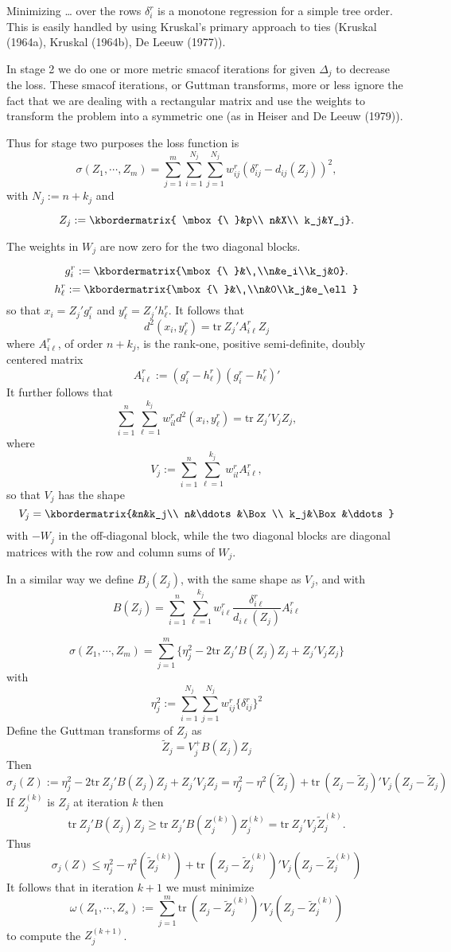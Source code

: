 \documentclass[
  12pt,
]{article}
\begin{document}
Minimizing \ldots{} over the rows \(\delta_i^r\) is a monotone regression for a simple tree order. This is easily handled by using Kruskal's primary approach
to ties (Kruskal (1964a), Kruskal (1964b), De Leeuw (1977)).

In stage 2 we do one or more metric smacof iterations for given \(\Delta_j\)
to decrease the loss. These smacof iterations, or Guttman transforms, more or less ignore the fact that we are dealing with a rectangular matrix and use the weights to transform the problem into a symmetric one (as in Heiser and De Leeuw (1979)).

Thus for stage two purposes the loss function is
\[
\sigma(Z_1,\cdots,Z_m)=\sum_{j=1}^m\sum_{i=1}^{N_j}\sum_{j=1}^{N_j}w_{ij}^r(\delta_{ij}^r-d_{ij}(Z_j))^2,
\]
with \(N_j:=n+k_j\) and

\[
Z_j:=\kbordermatrix{
\mbox{\ }&p\\
n&X\\
k_j&Y_j}.
\]

The weights in \(W_j\) are now zero for the two diagonal blocks.

\[
g_i^r:=\kbordermatrix{\mbox{\ }&\ \\n&e_i\\k_j&0}.
\]
\[
h_\ell^r:=\kbordermatrix{\mbox{\ }&\ \\n&0\\k_j&e_\ell}
\]
so that \(x_i=Z_j'g_i^r\) and \(y_\ell^r=Z_j'h_\ell^r\). It follows that
\[
d^2(x_i,y_\ell^r)=\text{tr}\ Z_j'A^r_{i\ell}Z_j^{\ }
\]
where \(A_{i\ell}^r\), of order \(n+k_j\), is the rank-one, positive semi-definite, doubly centered matrix
\[
A_{i\ell}^r:=(g_i^r-h_\ell^r)(g_i^r-h_\ell^r)'
\]
It further follows that
\[
\sum_{i=1}^n\sum_{\ell=1}^{k_j}w_{il}^rd^2(x_i,y_\ell^r)=\text{tr}\ Z_j'V_jZ_j,
\]
where
\[
V_j:=\sum_{i=1}^n\sum_{\ell=1}^{k_j}w_{il}^rA^r_{i\ell},
\]
so that \(V_j\) has the shape
\[
V_j=\kbordermatrix{&n&k_j\\
n&\ddots&\Box\\
k_j&\Box&\ddots}
\]
with \(-W_j\) in the off-diagonal block, while the two diagonal
blocks are diagonal matrices with the row and column sums of \(W_j\).

In a similar way we define \(B_j(Z_j)\), with the same shape as \(V_j\), and with
\[
B(Z_j)=\sum_{i=1}^n\sum_{\ell=1}^{k_j}w_{i\ell}^r\frac{\delta_{i\ell}^r }{d_{i\ell}(Z_j)}A^r_{i\ell}
\]

\[
\sigma(Z_1,\cdots,Z_m)=\sum_{j=1}^m\{\eta_j^2-2\text{tr}\ Z_j'B(Z_j)Z_j+Z_j'V_jZ_j\}
\]
with
\[
\eta_j^2:=\sum_{i=1}^{N_j}\sum_{j=1}^{N_j}w_{ij}^r\{\delta_{ij}^r\}^2
\]
Define the Guttman transforms of \(Z_j\) as
\[
\tilde Z_j=V_j^+B(Z_j)Z_j
\]
Then
\[
\sigma_j(Z):=\eta_j^2-2\text{tr}\ Z_j'B(Z_j)Z_j+Z_j'V_jZ_j=\eta_j^2-\eta^2(\tilde Z_j)+\text{tr}\ (Z_j-\tilde Z_j)'V_j(Z_j-\tilde Z_j)
\]
If \(Z_j^{(k)}\) is \(Z_j\) at iteration \(k\) then
\[
\text{tr}\ Z_j'B(Z_j)Z_j\geq\text{tr}\ Z_j'B(Z_j^{(k)})Z_j^{(k)}=\text{tr}\ Z_j'V_j\tilde Z_j^{(k)}.
\]
Thus
\[
\sigma_j(Z)\leq\eta_j^2-\eta^2(\tilde Z_j^{(k)})+\text{tr}\ (Z_j-\tilde Z_j^{(k)})'V_j(Z_j-\tilde Z_j^{(k)})
\]
It follows that in iteration \(k+1\) we must minimize
\[
\omega(Z_1,\cdots,Z_s):=\sum_{j=1}^m\text{tr}\ (Z_j-\tilde Z_j^{(k)})'V_j(Z_j-\tilde Z_j^{(k)})
\]
to compute the \(Z_j^{(k+1)}\).
\end{document}
